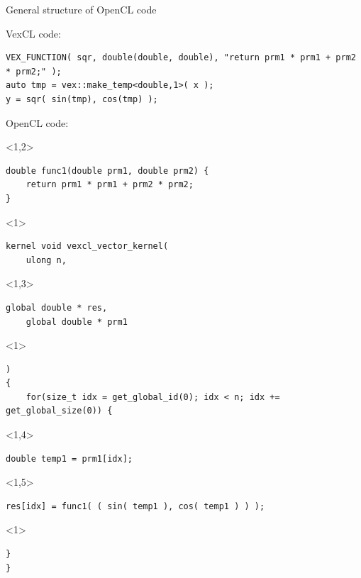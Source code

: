 \documentclass[@BEAMER_OPTIONS@]{beamer}
\begin{document}
\begin{frame}[fragile,shrink=5]{General structure of OpenCL code}
    \begin{exampleblock}{VexCL code:}
            \begin{lstlisting}
VEX_FUNCTION( sqr, double(double, double), "return prm1 * prm1 + prm2 * prm2;" );
auto tmp = vex::make_temp<double,1>( x );
y = sqr( sin(tmp), cos(tmp) );
            \end{lstlisting}
    \end{exampleblock}
    \begin{exampleblock}{OpenCL code:}
        \begin{uncoverenv}<1,2>
            \begin{lstlisting}
double func1(double prm1, double prm2) {
    return prm1 * prm1 + prm2 * prm2;
}
            \end{lstlisting}
        \end{uncoverenv}
        \begin{uncoverenv}<1>
            \begin{lstlisting}[firstnumber=last]
kernel void vexcl_vector_kernel(
    ulong n,
            \end{lstlisting}
        \end{uncoverenv}
        \begin{uncoverenv}<1,3>
            \begin{lstlisting}[firstnumber=last]
    global double * res,
    global double * prm1
            \end{lstlisting}
        \end{uncoverenv}
        \begin{uncoverenv}<1>
            \begin{lstlisting}[firstnumber=last]
)
{
    for(size_t idx = get_global_id(0); idx < n; idx += get_global_size(0)) {
            \end{lstlisting}
        \end{uncoverenv}
        \begin{uncoverenv}<1,4>
            \begin{lstlisting}[firstnumber=last]
        double temp1 = prm1[idx];
            \end{lstlisting}
        \end{uncoverenv}
        \begin{uncoverenv}<1,5>
            \begin{lstlisting}[firstnumber=last]
        res[idx] = func1( ( sin( temp1 ), cos( temp1 ) ) );
            \end{lstlisting}
        \end{uncoverenv}
        \begin{uncoverenv}<1>
            \begin{lstlisting}[firstnumber=last]
    }
}
            \end{lstlisting}
        \end{uncoverenv}
    \end{exampleblock}
\end{frame}
\end{document}
